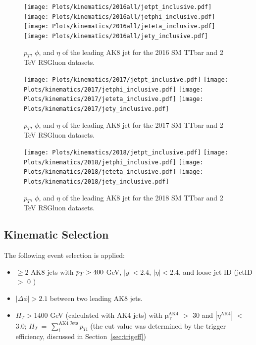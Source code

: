 \begin{figure}[htp]
	\begin{center}
		\texttt{[image: Plots/kinematics/2016all/jetpt\_inclusive.pdf]}
		\texttt{[image: Plots/kinematics/2016all/jetphi\_inclusive.pdf]}
		\texttt{[image: Plots/kinematics/2016all/jeteta\_inclusive.pdf]}
		\texttt{[image: Plots/kinematics/2016all/jety\_inclusive.pdf]}
		
		\caption{$p_T$, $\phi$, and  $\eta$ of the leading AK8 jet for the 2016 SM TTbar and 2 TeV RSGluon datasets.}
		\label{fig:kin2016}
	\end{center}
\end{figure}

\begin{figure}[htp]
	\begin{center}
		\texttt{[image: Plots/kinematics/2017/jetpt\_inclusive.pdf]}
		\texttt{[image: Plots/kinematics/2017/jetphi\_inclusive.pdf]}
		\texttt{[image: Plots/kinematics/2017/jeteta\_inclusive.pdf]}
		\texttt{[image: Plots/kinematics/2017/jety\_inclusive.pdf]}
		
		\caption{$p_T$, $\phi$, and  $\eta$ of the leading AK8 jet for the 2017 SM TTbar and 2 TeV RSGluon datasets.}
		\label{fig:kin2017}
	\end{center}
\end{figure}

\begin{figure}[htp]
	\begin{center}
		\texttt{[image: Plots/kinematics/2018/jetpt\_inclusive.pdf]}
		\texttt{[image: Plots/kinematics/2018/jetphi\_inclusive.pdf]}
		\texttt{[image: Plots/kinematics/2018/jeteta\_inclusive.pdf]}
		\texttt{[image: Plots/kinematics/2018/jety\_inclusive.pdf]}
		
		\caption{$p_T$, $\phi$, and  $\eta$ of the leading AK8 jet for the 2018 SM TTbar and 2 TeV RSGluon datasets.}
		\label{fig:kin2018}
	\end{center}
\end{figure}



\subsection{Kinematic Selection}


The following event selection is applied: 


\begin{itemize}
\item $\ge 2$ AK8 jets with $p_T > 400$ GeV, $|y| < 2.4$, $|\eta| < 2.4$, and loose jet ID (jetID $>$ 0 \cite{jetid})
\item $|\Delta \phi| > 2.1$ between two leading AK8 jets. 
\item $H_T > 1400$ GeV (calculated with AK4 jets) with ${\mathrm{p}}^{\mathrm{AK4}}_{\mathrm{T}}$ $>$ 30 and $|\eta^{\mathrm{AK4}}|$ $<$ 3.0; $H_T\ =\ \sum_i^{\mathrm{AK4\ Jets}}{p_{Ti}}$ (the cut value was determined by the trigger efficiency, discussed in Section~\ref{sec:trigeff})

\end{itemize}


